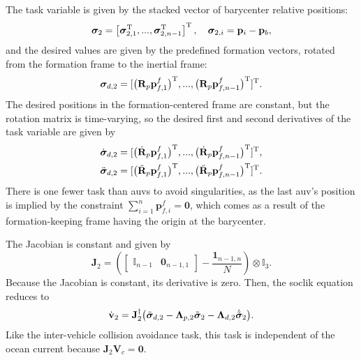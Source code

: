 The task variable is given by the stacked vector of barycenter relative positions:
\begin{equation}\label{eq:formation_keeping_task_variable}
    \bm{\sigma}_2 = \left[ \bm{\sigma}_{2,1}^{\rm T}, ..., \bm{\sigma}_{2,n-1}^{\rm T}\right]^{\rm T}, \quad \bm{\sigma}_{2,i}  = \mathbf{p}_i - \mathbf{p}_b,
\end{equation}
and the desired values are given by the predefined formation vectors, rotated from the formation frame to the inertial frame:
\begin{equation}\label{eq:formation_keeping_desired_task_variable}
    \bm{\sigma}_{d,2} = [\bigl(\mathbf{R}_p \mathbf{p}_{f,1}^f\bigr)^{\rm T}, ..., \bigl(\mathbf{R}_p \mathbf{p}_{f,n-1}^f\bigr) ^{\rm T}] ^{\rm T}.
\end{equation}
The desired positions in the formation-centered frame are constant, but the rotation matrix is time-varying, so the desired first and second derivatives of the task variable are given by
\begin{align}
    \dot{\bm{\sigma}}_{d,2} &= [\bigl(\dot{\mathbf{R}}_p \mathbf{p}_{f,1}^f\bigr)^{\rm T}, ..., \bigl(\dot{\mathbf{R}}_p \mathbf{p}_{f,n-1}^f\bigr) ^{\rm T}] ^{\rm T},\\
    \ddot{\bm{\sigma}}_{d,2} &= [\bigl(\ddot{\mathbf{R}}_p \mathbf{p}_{f,1}^f\bigr)^{\rm T}, ..., \bigl(\ddot{\mathbf{R}}_p \mathbf{p}_{f,n-1}^f\bigr) ^{\rm T}] ^{\rm T}.
\end{align}
There is one fewer task than \glspl{auv} to avoid singularities, as the last \gls{auv}'s position is implied by the constraint $\sum_{i=1}^n \mathbf{p}_{f,i}^f = \mathbf{0}$, which comes as a result of the formation-keeping frame having the origin at the barycenter.

The Jacobian is constant and given by
\begin{equation}
    \mathbf{J}_2 = \left(\begin{bmatrix}
        \mathbb{I}_{n-1} & \mathbf{0}_{n-1, 1}
    \end{bmatrix} - \frac{\mathbf{1}_{n-1, n}}{N}\right)\otimes \mathbb{I}_3.
\end{equation}
Because the Jacobian is constant, its derivative is zero. Then, the \gls{soclik} equation reduces to
\begin{equation}\label{eq:formation_keeping_controller}
    \dot{\mathbf{v}}_2 = \mathbf{J}_2^\dagger \bigl(\ddot{\bm{\sigma}}_{d,2} - \mathbf{\Lambda}_{p,2}\Tilde{\bm{\sigma}}_2 - \mathbf{\Lambda}_{d,2} \dot{\Tilde{\bm{\sigma}}}_2\bigl).
\end{equation}
Like the inter-vehicle collision avoidance task, this task is independent of the ocean current because $\mathbf{J}_2 \mathbf{V}_c = \mathbf{0}$.

